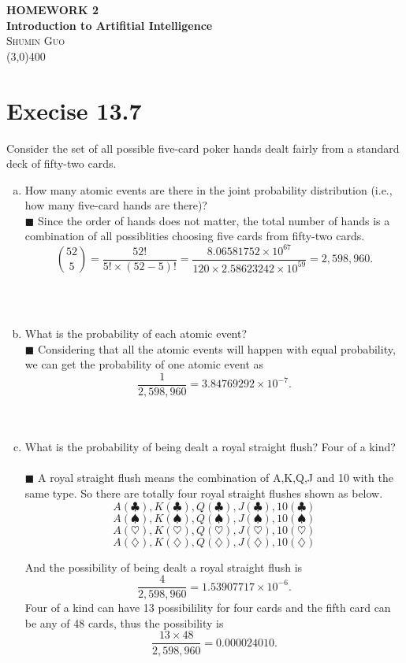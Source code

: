 \documentclass{article}
\newcommand{\solution}[1]{~\\ $\blacksquare$ \sffamily\upshape\selectfont #1
\normalfont ~\\~ }
\begin{document}
\begin{center}
\textbf{\large{
HOMEWORK 2 \\
Introduction to Artifitial Intelligence \\}}
\textsc{\Large{Shumin Guo}}\\
\line(3,0){400}
\end{center}

\section{Execise 13.7}
Consider the set of all possible five-card poker hands dealt fairly
from a standard deck of fifty-two cards.
\begin{enumerate}[a.]
\item How many atomic events are there in the joint probability
  distribution (i.e., how many five-card hands are there)?
  \solution{Since the order of hands does not matter, the total number
  of hands is a combination of all possiblities choosing five cards
  from fifty-two cards. 
  \[ {52 \choose 5} = \frac{52!}{5!\times (52-5)!} =
  \frac{8.06581752\times 10^{67}}{120\times 2.58623242 \times 10^{59}}
  = 2,598,960. \]
} 
\item What is the probability of each atomic event?
  \solution{Considering that all the atomic events will happen with
    equal probability, we can get the probability of one atomic event
    as \[ \frac{1}{2,598,960}=3.84769292\times 10^{-7}. \]} 
\item What is the probability of being dealt a royal straight flush?
  Four of a kind? 
  \solution{A royal straight flush means the combination of A,K,Q,J
    and 10 with the same type. So there are totally four royal
    straight flushes shown as below. 
    \[ A(\clubsuit), K(\clubsuit), Q(\clubsuit), J(\clubsuit),
    10(\clubsuit) \] 
    \[ A(\spadesuit), K(\spadesuit), Q(\spadesuit), J(\spadesuit),
    10(\spadesuit) \]
    \[ A(\heartsuit), K(\heartsuit), Q(\heartsuit), J(\heartsuit),
    10(\heartsuit) \]
    \[ A(\diamondsuit), K(\diamondsuit), Q(\diamondsuit), J(\diamondsuit),
    10(\diamondsuit) \]
    
    And the possibility of being dealt a royal straight flush is 
    \[ \frac{4}{2,598,960}=1.53907717 \times 10^{-6}. \] 
    Four of a kind can have 13 possibilility for four cards and the fifth
    card can be any of 48 cards, thus the possibility is 
    \[ \frac{13\times 48}{2,598,960} = 0.000024010. \]
  }
\end{enumerate}
\end{document}
